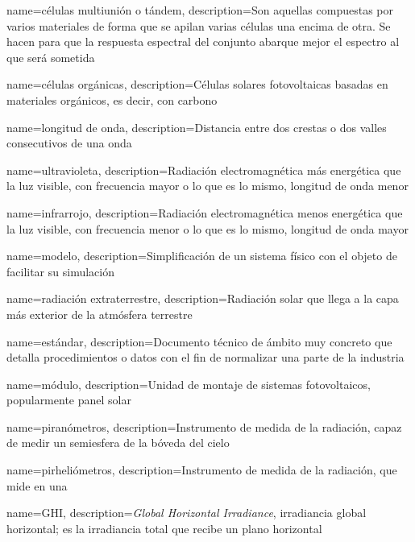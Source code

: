 {
    name={células multiunión o tándem},
    description={Son aquellas compuestas por varios materiales de forma que se apilan varias células una encima de otra. Se hacen para que la \gls{respuesta espectral} del conjunto abarque mejor el espectro al que será sometida}
}

{
    name={células orgánicas},
    description={Células solares fotovoltaicas basadas en materiales orgánicos, es decir, con carbono}
}

{
    name={longitud de onda},
    description={Distancia entre dos crestas o dos valles consecutivos de una onda}
}

{
    name={ultravioleta},
    description={Radiación electromagnética más energética que la luz visible, con frecuencia mayor o lo que es lo mismo, \gls{longitud de onda} menor}
}

{
    name={infrarrojo},
    description={Radiación electromagnética menos energética que la luz visible, con frecuencia menor o lo que es lo mismo, \gls{longitud de onda} mayor}
}

{
    name={modelo},
    description={Simplificación de un sistema físico con el objeto de facilitar su simulación}
}

{
    name={radiación extraterrestre},
    description={Radiación solar que llega a la capa más exterior de la atmósfera terrestre}
}

{
    name={estándar},
    description={Documento técnico de ámbito muy concreto que detalla procedimientos o datos con el fin de normalizar una parte de la industria}
}

{
    name={módulo},
    description={Unidad de montaje de sistemas fotovoltaicos, popularmente panel solar}
}

{
    name={piranómetros},
    description={Instrumento de medida de la radiación, capaz de medir un semiesfera de la bóveda del cielo}
}

{
    name={pirheliómetros},
    description={Instrumento de medida de la radiación, que mide en una }
}

{
    name={GHI},
    description={\textit{Global Horizontal Irradiance}, irradiancia global horizontal; es la irradiancia total que recibe un plano horizontal}
}

